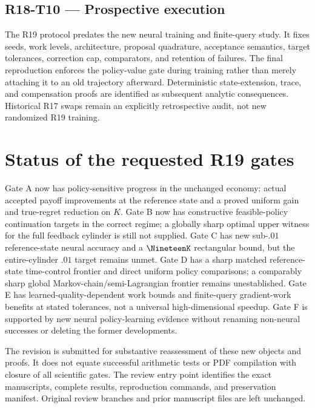 \subsection{R18-T10 --- Prospective execution}
The R19 protocol predates the new neural training and finite-query study. It fixes seeds, work levels, architecture, proposal quadrature, acceptance semantics, target tolerances, correction cap, comparators, and retention of failures. The final reproduction enforces the policy-value gate during training rather than merely attaching it to an old trajectory afterward. Deterministic state-extension, trace, and compensation proofs are identified as subsequent analytic consequences. Historical R17 swaps remain an explicitly retrospective audit, not new randomized R19 training.

\section{Status of the requested R19 gates}
Gate A now has policy-sensitive progress in the unchanged economy: actual accepted payoff improvements at the reference state and a proved uniform gain and true-regret reduction on $K$. Gate B now has constructive feasible-policy continuation targets in the correct regime; a globally sharp optimal upper witness for the full feedback cylinder is still not supplied. Gate C has new sub-$.01$ reference-state neural accuracy and a $\NineteenK$ rectangular bound, but the entire-cylinder $.01$ target remains unmet. Gate D has a sharp matched reference-state time-control frontier and direct uniform policy comparisons; a comparably sharp global Markov-chain/semi-Lagrangian frontier remains unestablished. Gate E has learned-quality-dependent work bounds and finite-query gradient-work benefits at stated tolerances, not a universal high-dimensional speedup. Gate F is supported by new neural policy-learning evidence without renaming non-neural successes or deleting the former developments.

The revision is submitted for substantive reassessment of these new objects and proofs. It does not equate successful arithmetic tests or PDF compilation with closure of all scientific gates. The review entry point identifies the exact manuscripts, complete results, reproduction commands, and preservation manifest. Original review branches and prior manuscript files are left unchanged.
